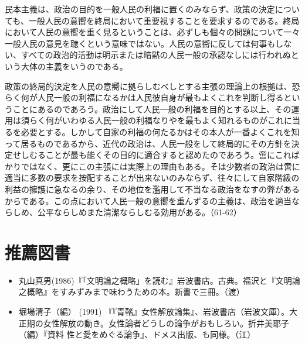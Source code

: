 民本主義は、政治の目的を一般人民の利福に置くのみならず、政策の決定についても、一般人民の意嚮を終局において重要視することを要求するのである。終局において人民の意嚮を重く見るということは、必ずしも個々の問題について一々一般人民の意見を聴くという意味ではない。人民の意嚮に反しては何事もしない、すべての政治的活動は明示または暗黙の人民一般の承認なしには行われぬという大体の主義をいうのである。

政策の終局的決定を人民の意嚮に拠らしむべしとする主張の理論上の根拠は、恐らく何が人民一般の利福になるかは人民彼自身が最もよくこれを判断し得るということにあるのであろう。政治にして人民一般の利福を目的とする以上、その運用は須らく何がいわゆる人民一般の利福なりやを最もよく知れるものがこれに当るを必要とする。しかして自家の利福の何たるかはその本人が一番よくこれを知って居るものであるから、近代の政治は、人民一般をして終局的にその方針を決定せしむることが最も能くその目的に適合すると認めたのであろう。啻にこればかりではなく、更にこの主張には実際上の理由もある。そは少数者の政治は啻に適当に多数の要求を按配することが出来ないのみならず、往々にして自家階級の利益の擁護に急なるの余り、その地位を濫用して不当なる政治をなすの弊があるからである。この点において人民一般の意嚮を重んずるの主義は、政治を適当ならしめ、公平ならしめまた清潔ならしむる効用がある。（61-62）

\vspace{2zw}

\section{推薦図書}


\begin{itemize}
\item 丸山真男(1986)『「文明論之概略」を読む』岩波書店。古典。福沢と『文明論之概略』をすみずみまで味わうための本。新書で三冊。（渡）
\item 堀場清子（編） (1991) 『『青鞜』女性解放論集』、岩波書店（岩波文庫）。大正期の女性解放の動き。女性論者どうしの論争がおもしろい。折井美耶子（編）『資料 性と愛をめぐる論争』、ドメス出版、も同様。（江）
\end{itemize}




